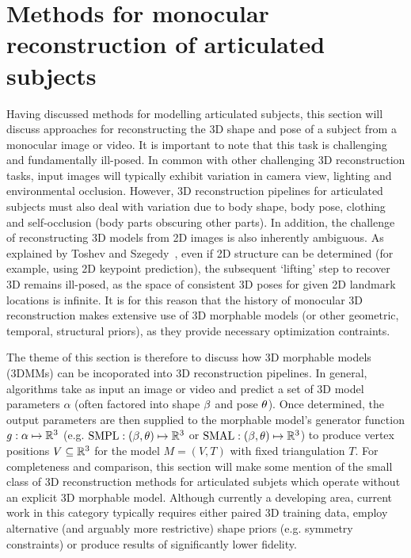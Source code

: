 \section{Methods for monocular reconstruction of articulated subjects}

    Having discussed methods for modelling articulated subjects, this section will discuss approaches for reconstructing the 3D shape and pose of a subject from a monocular image or video. It is important to note that this task is challenging and fundamentally ill-posed. In common with other challenging 3D reconstruction tasks, input images will typically exhibit variation in camera view, lighting and environmental occlusion. However, 3D reconstruction pipelines for articulated subjects must also deal with variation due to body shape, body pose, clothing and self-occlusion (body parts obscuring other parts). In addition, the challenge of reconstructing 3D models from 2D images is also inherently ambiguous. As explained by Toshev and Szegedy~\cite{toshev2014deeppose}, even if 2D structure can be determined (for example, using 2D keypoint prediction), the subsequent `lifting' step to recover 3D remains ill-posed, as the space of consistent 3D poses for given 2D landmark locations is infinite. It is for this reason that the history of monocular 3D reconstruction makes extensive use of 3D morphable models (or other geometric, temporal, structural priors), as they provide necessary optimization contraints.

    The theme of this section is therefore to discuss how 3D morphable models (3DMMs) can be incoporated into 3D reconstruction pipelines. In general, algorithms take as input an image or video and predict a set of 3D model parameters $\alpha$ (often factored into shape $\beta$ and pose $\theta$). Once determined, the output parameters are then supplied to the morphable model's generator function $g: \alpha \mapsto {\mathbb{R}^{3}}$ (e.g. $\operatorname{SMPL}: (\beta, \theta) \mapsto {\mathbb{R}^{3}}$ or $\operatorname{SMAL}: (\beta, \theta) \mapsto {\mathbb{R}^{3}}$) to produce vertex positions $V \subseteq {\mathbb{R}^{3}}$ for the model $M = (V, T)$ with fixed triangulation $T$. For completeness and comparison, this section will make some mention of the small class of 3D reconstruction methods for articulated subjets which operate without an explicit 3D morphable model. Although currently a developing area, current work in this category typically requires either paired 3D training data, employ alternative (and arguably more restrictive) shape priors (e.g. symmetry constraints) or produce results of significantly lower fidelity.


